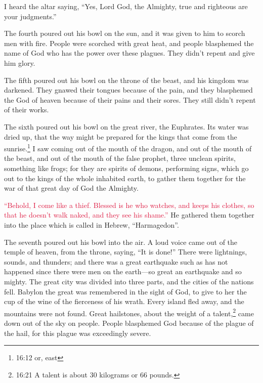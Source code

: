\myverse{}I heard the altar saying, “Yes, Lord God, the Almighty, true and
righteous are your judgments.”

\myverse{}The fourth poured out his bowl on the sun, and it was given to
him to scorch men with fire.
\myverse{}People were scorched with great heat, and people blasphemed the name of God
who has the power over these plagues. They didn’t repent and give him glory.

\myverse{}The fifth poured out his bowl on the throne of the beast, and
his kingdom was darkened. They gnawed their tongues because of the pain,
\myverse{}and they blasphemed the God of heaven because of their pains and their sores.
They still didn’t repent of their works.

\myverse{}The sixth poured out his bowl on the great river, the Euphrates.
Its water was dried up, that the way might be prepared for the kings that come from the sunrise.\footnote{16:12 or, east}
\myverse{}I saw coming out of the mouth of the dragon, and out of the mouth of the
beast, and out of the mouth of the false prophet, three unclean spirits, something like frogs;
\myverse{}for they are spirits of demons, performing signs, which go out to the kings
of the whole inhabited earth, to gather them together for the war of that great day of God the Almighty.

\myverse{}\textcolor{crimson}{“Behold, I come like a thief. Blessed is he who watches,
	and keeps his clothes, so that he doesn’t walk naked, and they see his shame.”
}
\myverse{}He gathered them together into the place which is called in Hebrew, “Harmagedon”.

\myverse{}The seventh poured out his bowl into the air. A loud voice came
out of the temple of heaven, from the throne, saying, “It is done!”
\myverse{}There were lightnings, sounds, and thunders; and there was a great earthquake
such as has not happened since there were men on the earth—so great an earthquake and so mighty.
\myverse{}The great city was divided into three parts, and the cities of the nations
fell. Babylon the great was remembered in the sight of God, to give to her the cup of the wine of the
fierceness of his wrath.
\myverse{}Every island fled away, and the mountains were not found.
\myverse{}Great hailstones, about the weight of a talent,\footnote{16:21 A talent is about 30 kilograms or 66 pounds.} came down out of the sky on people. People
blasphemed God because of the plague of the hail, for this plague was exceedingly severe.



